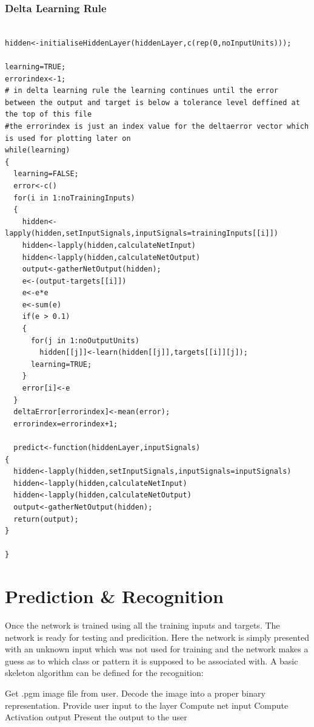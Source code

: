 \documentclass[a4paper,12pt]{report}
\begin{document}
\subsubsection*{Delta Learning Rule}
\begin{verbatim}
 
hidden<-initialiseHiddenLayer(hiddenLayer,c(rep(0,noInputUnits)));

learning=TRUE;
errorindex<-1;
# in delta learning rule the learning continues until the error between the output and target is below a tolerance level deffined at the top of this file
#the errorindex is just an index value for the deltaerror vector which is used for plotting later on
while(learning)
{
  learning=FALSE;
  error<-c()
  for(i in 1:noTrainingInputs)
  {
    hidden<-lapply(hidden,setInputSignals,inputSignals=trainingInputs[[i]])
    hidden<-lapply(hidden,calculateNetInput)
    hidden<-lapply(hidden,calculateNetOutput)
    output<-gatherNetOutput(hidden);
    e<-(output-targets[[i]])
    e<-e*e
    e<-sum(e)
    if(e > 0.1)
    {
      for(j in 1:noOutputUnits)
        hidden[[j]]<-learn(hidden[[j]],targets[[i]][j]);
      learning=TRUE;
    }
    error[i]<-e
  }
  deltaError[errorindex]<-mean(error);
  errorindex=errorindex+1;
  
  predict<-function(hiddenLayer,inputSignals)
{
  hidden<-lapply(hidden,setInputSignals,inputSignals=inputSignals)
  hidden<-lapply(hidden,calculateNetInput)
  hidden<-lapply(hidden,calculateNetOutput)
  output<-gatherNetOutput(hidden);
  return(output);
}

}

\end{verbatim}



\section*{Prediction \& Recognition}
Once the network is trained using all the training inputs and targets. The network is ready for testing and predicition. Here the network 
is simply presented with an unknown input which was not used for training and the network makes a guess as to which class or pattern it is supposed to be associated with.
A basic skeleton algorithm can be defined for the recognition:
\begin{algorithm}[h!]
 \begin{algorithmic}[h!]
  \State Get .pgm image file from user.
  \State Decode the image into a proper binary representation.
  \State Provide user input to the layer
   \State Compute net input
   \State Compute Activation output
   \State Present the output to the user

 \end{algorithmic}
\end{algorithm}
\end{document}
